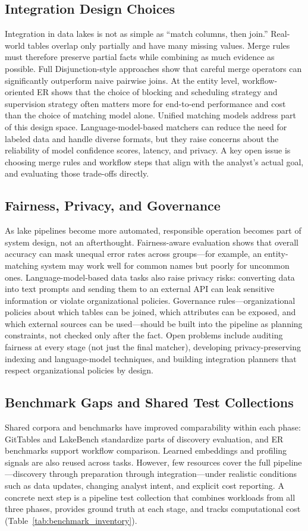 \documentclass[sigconf]{acmart}
\begin{document}
\subsection{Integration Design Choices}
Integration in data lakes is not as simple as ``match columns, then join.'' Real-world tables overlap only partially and have many missing values. Merge rules must therefore preserve partial facts while combining as much evidence as possible. Full Disjunction-style approaches show that careful merge operators can significantly outperform naive pairwise joins. At the entity level, workflow-oriented ER shows that the choice of blocking and scheduling strategy and supervision strategy often matters more for end-to-end performance and cost than the choice of matching model alone. Unified matching models address part of this design space. Language-model-based matchers can reduce the need for labeled data and handle diverse formats, but they raise concerns about the reliability of model confidence scores, latency, and privacy. A key open issue is choosing merge rules and workflow steps that align with the analyst's actual goal, and evaluating those trade-offs directly.

\subsection{Fairness, Privacy, and Governance}
As lake pipelines become more automated, responsible operation becomes part of system design, not an afterthought. Fairness-aware evaluation shows that overall accuracy can mask unequal error rates across groups---for example, an entity-matching system may work well for common names but poorly for uncommon ones. Language-model-based data tasks also raise privacy risks: converting data into text prompts and sending them to an external API can leak sensitive information or violate organizational policies. Governance rules---organizational policies about which tables can be joined, which attributes can be exposed, and which external sources can be used---should be built into the pipeline as planning constraints, not checked only after the fact. Open problems include auditing fairness at every stage (not just the final matcher), developing privacy-preserving indexing and language-model techniques, and building integration planners that respect organizational policies by design.

\subsection{Benchmark Gaps and Shared Test Collections}
Shared corpora and benchmarks have improved comparability within each phase: GitTables and LakeBench standardize parts of discovery evaluation, and ER benchmarks support workflow comparison. Learned embeddings and profiling signals are also reused across tasks. However, few resources cover the full pipeline---discovery through preparation through integration---under realistic conditions such as data updates, changing analyst intent, and explicit cost reporting. A concrete next step is a pipeline test collection that combines workloads from all three phases, provides ground truth at each stage, and tracks computational cost (Table~\ref{tab:benchmark_inventory}).
\end{document}

